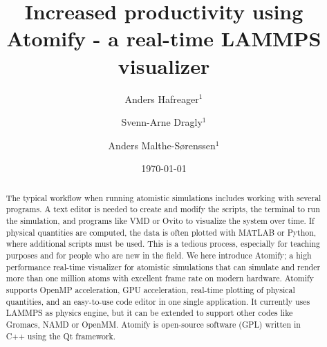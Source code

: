 \documentclass[aps,pre,twocolumn,letterpaper,floatfix,nofootinbib]{revtex4}
\begin{document}
\title{Increased productivity using Atomify - a real-time LAMMPS visualizer}
\author{Anders Hafreager$^1$}
\author{Svenn-Arne Dragly$^{1}$} 
\author{Anders Malthe-S\o renssen$^1$}
\date{\today} 


\begin{abstract}
%
The typical workflow when running atomistic simulations includes working with several programs.
A text editor is needed to create and modify the scripts, the terminal to run the simulation, and programs like VMD or Ovito to visualize the system over time.
If physical quantities are computed, the data is often plotted with MATLAB or Python, where additional scripts must be used.
This is a tedious process, especially for teaching purposes and for people who are new in the field.
We here introduce Atomify; a high performance real-time visualizer for atomistic simulations that can simulate and render more than one million atoms with excellent frame rate on modern hardware.
Atomify supports OpenMP acceleration, GPU acceleration, real-time plotting of physical quantities, and an easy-to-use code editor in one single application.
It currently uses LAMMPS as physics engine, but it can be extended to support other codes like Gromacs, NAMD or OpenMM.
Atomify is open-source software (GPL) written in C++ using the Qt framework.
%
\end{abstract} 
 
\maketitle
\end{document}

